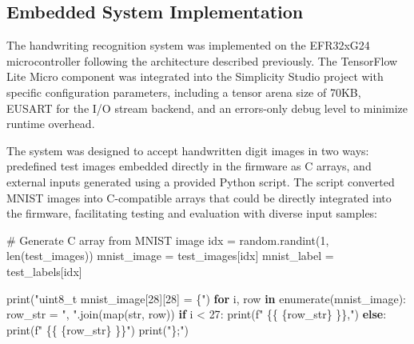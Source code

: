 \documentclass[
  9pt,
  letterpaper,
  abstract,
  titlepage]{scrbook}
\newenvironment{Shaded}{\begin{snugshade}}{\end{snugshade}}
\newcommand{\BuiltInTok}[1]{\textcolor[rgb]{0.00,0.23,0.31}{#1}}
\newcommand{\CharTok}[1]{\textcolor[rgb]{0.13,0.47,0.30}{#1}}
\newcommand{\CommentTok}[1]{\textcolor[rgb]{0.37,0.37,0.37}{#1}}
\newcommand{\ControlFlowTok}[1]{\textcolor[rgb]{0.00,0.23,0.31}{\textbf{#1}}}
\newcommand{\DecValTok}[1]{\textcolor[rgb]{0.68,0.00,0.00}{#1}}
\newcommand{\KeywordTok}[1]{\textcolor[rgb]{0.00,0.23,0.31}{\textbf{#1}}}
\newcommand{\NormalTok}[1]{\textcolor[rgb]{0.00,0.23,0.31}{#1}}
\newcommand{\OperatorTok}[1]{\textcolor[rgb]{0.37,0.37,0.37}{#1}}
\newcommand{\SpecialCharTok}[1]{\textcolor[rgb]{0.37,0.37,0.37}{#1}}
\newcommand{\SpecialStringTok}[1]{\textcolor[rgb]{0.13,0.47,0.30}{#1}}
\newcommand{\StringTok}[1]{\textcolor[rgb]{0.13,0.47,0.30}{#1}}
\begin{document}
\subsection{Embedded System
Implementation}\label{embedded-system-implementation}

The handwriting recognition system was implemented on the EFR32xG24
microcontroller following the architecture described previously. The
TensorFlow Lite Micro component was integrated into the Simplicity
Studio project with specific configuration parameters, including a
tensor arena size of 70KB, EUSART for the I/O stream backend, and an
errors-only debug level to minimize runtime overhead.

The system was designed to accept handwritten digit images in two ways:
predefined test images embedded directly in the firmware as C arrays,
and external inputs generated using a provided Python script. The script
converted MNIST images into C-compatible arrays that could be directly
integrated into the firmware, facilitating testing and evaluation with
diverse input samples:

\begin{Shaded}
\begin{Highlighting}[]
\CommentTok{\# Generate C array from MNIST image}
\NormalTok{idx }\OperatorTok{=}\NormalTok{ random.randint(}\DecValTok{1}\NormalTok{, }\BuiltInTok{len}\NormalTok{(test\_images))}
\NormalTok{mnist\_image }\OperatorTok{=}\NormalTok{ test\_images[idx]}
\NormalTok{mnist\_label }\OperatorTok{=}\NormalTok{ test\_labels[idx]}

\BuiltInTok{print}\NormalTok{(}\StringTok{"uint8\_t mnist\_image[28][28] = \{"}\NormalTok{)}
\ControlFlowTok{for}\NormalTok{ i, row }\KeywordTok{in} \BuiltInTok{enumerate}\NormalTok{(mnist\_image):}
\NormalTok{    row\_str }\OperatorTok{=} \StringTok{", "}\NormalTok{.join(}\BuiltInTok{map}\NormalTok{(}\BuiltInTok{str}\NormalTok{, row))}
    \ControlFlowTok{if}\NormalTok{ i }\OperatorTok{\textless{}} \DecValTok{27}\NormalTok{:}
        \BuiltInTok{print}\NormalTok{(}\SpecialStringTok{f" }\CharTok{\{\{}\SpecialStringTok{ }\SpecialCharTok{\{}\NormalTok{row\_str}\SpecialCharTok{\}}\SpecialStringTok{ }\CharTok{\}\}}\SpecialStringTok{,"}\NormalTok{)}
    \ControlFlowTok{else}\NormalTok{:}
        \BuiltInTok{print}\NormalTok{(}\SpecialStringTok{f" }\CharTok{\{\{}\SpecialStringTok{ }\SpecialCharTok{\{}\NormalTok{row\_str}\SpecialCharTok{\}}\SpecialStringTok{ }\CharTok{\}\}}\SpecialStringTok{"}\NormalTok{)}
\BuiltInTok{print}\NormalTok{(}\StringTok{"\};"}\NormalTok{)}
\end{Highlighting}
\end{Shaded}
\end{document}
